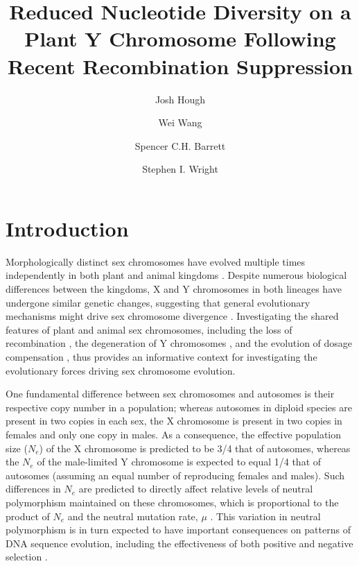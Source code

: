 \documentclass[9pt,twocolumn,twoside]{gsajnl}
\title{Reduced Nucleotide Diversity on a Plant Y Chromosome Following Recent Recombination Suppression}
\author[$\ast$,$\dagger$,1]{Josh Hough}
\author[$\dagger$]{Wei Wang}
\author[$\dagger$]{Spencer C.H. Barrett}
\author[$\dagger$]{Stephen I. Wright}
\affil[$\ast$]{Department of Plant Sciences, University of California, Davis}
\affil[$\dagger$]{Department of Ecology and Evolutionary Biology, University of Toronto}
\begin{document}
\maketitle
\thispagestyle{firststyle}
\marginmark
\firstpagefootnote
{}
\vspace{-11pt}%

\section*{Introduction}

\lettrine[lines=2]{\color{color2}M}{}orphologically distinct sex chromosomes have evolved multiple times independently in both plant and animal kingdoms \citep{westergaard1958,ohno1967,bull1983,charlesworth1991}. Despite numerous biological differences between the kingdoms, X and Y chromosomes in both lineages have undergone similar genetic changes, suggesting that general evolutionary mechanisms might drive sex chromosome divergence \citep{charlesworth1978,charlesworth1996CB,charlesworth2000degeneration}. Investigating the shared features of plant and animal sex chromosomes, including the loss of recombination \citep{bergero2009}, the degeneration of Y chromosomes \citep{hough2014,bergero2015}, and the evolution of dosage compensation \citep{muyle2012,papadopulos2015}, thus provides an informative context for investigating the evolutionary forces driving sex chromosome evolution.

One fundamental difference between sex chromosomes and autosomes is their respective copy number in a population; whereas autosomes in diploid species are present in two copies in each sex, the X chromosome is present in two copies in females and only one copy in males. As a consequence, the effective population size ($N_{e}$) of the X chromosome is predicted to be 3/4 that of autosomes, whereas the $N_{e}$ of the male-limited Y chromosome is expected to equal 1/4 that of autosomes (assuming an equal number of reproducing females and males). Such differences in $N_{e}$ are predicted to directly affect relative levels of neutral polymorphism maintained on these chromosomes, which is proportional to the product of $N_{e}$ and the neutral mutation rate, $\mu$ \citep{Kimura1984}. This variation in neutral polymorphism is in turn expected to have important consequences on patterns of DNA sequence evolution, including the effectiveness of both positive and negative selection \citep{charlesworth1987}.
\end{document}
